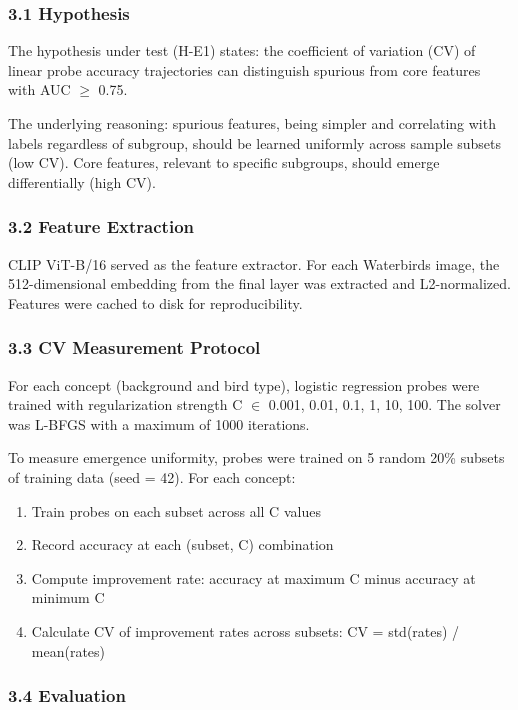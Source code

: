 
\subsubsection{3.1 Hypothesis}

The hypothesis under test (H-E1) states: the coefficient of variation (CV) of linear probe accuracy trajectories can distinguish spurious from core features with AUC $\geq$ 0.75.

The underlying reasoning: spurious features, being simpler and correlating with labels regardless of subgroup, should be learned uniformly across sample subsets (low CV). Core features, relevant to specific subgroups, should emerge differentially (high CV).

\subsubsection{3.2 Feature Extraction}

CLIP ViT-B/16 \citep{radford2021learning} served as the feature extractor. For each Waterbirds image, the 512-dimensional embedding from the final layer was extracted and L2-normalized. Features were cached to disk for reproducibility.

\subsubsection{3.3 CV Measurement Protocol}

For each concept (background and bird type), logistic regression probes were trained with regularization strength C $\in$ {0.001, 0.01, 0.1, 1, 10, 100}. The solver was L-BFGS with a maximum of 1000 iterations.

To measure emergence uniformity, probes were trained on 5 random 20\% subsets of training data (seed = 42). For each concept:

\begin{enumerate}
\item Train probes on each subset across all C values
\item Record accuracy at each (subset, C) combination
\item Compute improvement rate: accuracy at maximum C minus accuracy at minimum C
\item Calculate CV of improvement rates across subsets: CV = std(rates) / mean(rates)
\end{enumerate}

\subsubsection{3.4 Evaluation}

